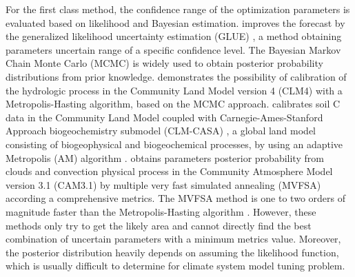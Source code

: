 \documentclass[gmd, manuscript]{copernicus}
\begin{document}
For the first class method, the confidence range of the optimization parameters is evaluated based on likelihood and Bayesian estimation. \cite{cameron1999flood} improves the forecast by the generalized likelihood uncertainty estimation (GLUE) \citep{beven1992future}, a method obtaining parameters uncertain range of a specific confidence level. The Bayesian Markov Chain Monte Carlo (MCMC) \citep{gilks2005markov} is widely used to obtain posterior probability distributions from prior knowledge. \cite{sun2013inverse} demonstrates the possibility of calibration of the hydrologic process in the Community Land Model version 4 (CLM4) \citep{lawrence2011parameterization,lawrence2007representing} with a Metropolis-Hasting algorithm, based on the MCMC approach. \cite{hararuk2014evaluation} calibrates soil C data in the  Community Land Model coupled with Carnegie-Ames-Stanford Approach biogeochemistry submodel (CLM-CASA) \citep{oleson2004technical,oleson2008improvements,parton1993observations}, a global land model consisting of biogeophysical and biogeochemical processes, by using an adaptive Metropolis (AM) algorithm \citep{gilks2005markov}. \cite{jackson2008error} obtains parameters posterior probability from clouds and convection physical process in the Community Atmosphere Model version 3.1 (CAM3.1) \citep{collins2004description} by multiple very fast simulated annealing (MVFSA) according a comprehensive metrics. The MVFSA method is one to two orders of magnitude faster than the Metropolis-Hasting algorithm \citep{jackson2004efficient}. However, these methods only try to get the likely area and cannot directly find the best combination of uncertain parameters with a minimum metrics value. Moreover, the posterior distribution heavily depends on assuming the likelihood function, which is usually difficult to determine for climate system model tuning problem.
\end{document}
